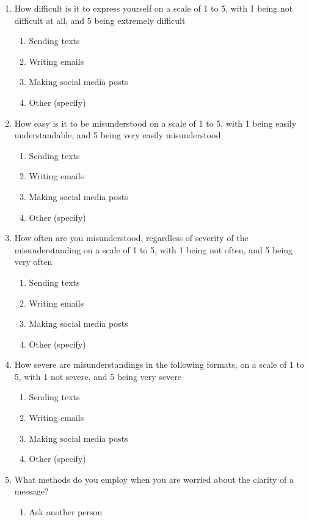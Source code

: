 \documentclass[acmsmall,screen,authorversion,nonacm]{acmart}
\begin{document}
\begin{enumerate}
  \item How difficult is it to express yourself on a scale of 1 to 5, with 1 being not difficult at all, and 5 being extremely difficult
  \begin{enumerate}
      \item Sending texts
      \item Writing emails
      \item Making social media posts
      \item Other (specify)
  \end{enumerate}
    \item How easy is it to be misunderstood on a scale of 1 to 5, with 1 being easily understandable, and 5 being very easily misunderstood
  \begin{enumerate}
      \item Sending texts
      \item Writing emails
      \item Making social media posts
      \item Other (specify)
  \end{enumerate}
  \item How often are you misunderstood, regardless of severity of the misunderstanding on a scale of 1 to 5, with 1 being not often, and 5 being very often
  \begin{enumerate}
      \item Sending texts
      \item Writing emails
      \item Making social media posts
      \item Other (specify)
  \end{enumerate}
  \item How severe are misunderstandings in the following formats, on a scale of 1 to 5, with 1 not severe, and 5 being very severe
  \begin{enumerate}
      \item Sending texts
      \item Writing emails
      \item Making social media posts
      \item Other (specify)
  \end{enumerate}
  \item What methods do you employ when you are worried about the clarity of a message?
  \begin{enumerate}
      \item Ask another person

\end{enumerate}
\end{enumerate}
\end{document}
